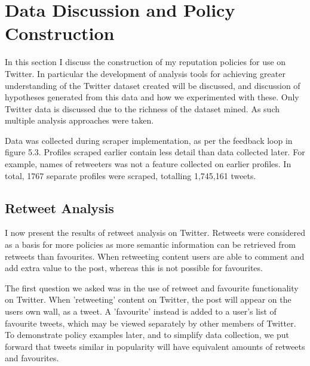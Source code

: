 \chapter{Data Discussion and Policy Construction}\label{C:us}

In this section I discuss the construction of my reputation policies for use on Twitter. In particular the development of analysis tools for achieving greater understanding of the Twitter dataset created will be discussed, and discussion of hypotheses generated from this data and how we experimented with these. Only Twitter data is discussed due to the richness of the dataset mined. As such multiple analysis approaches were taken.

Data was collected during scraper implementation, as per the feedback loop in figure 5.3. Profiles scraped earlier contain less detail than data collected later. For example, names of retweeters was not a feature collected on earlier profiles. In total, 1767 separate profiles were scraped, totalling 1,745,161 tweets. 





\section{Retweet Analysis}

I now present the results of retweet analysis on Twitter. Retweets were considered as a basis for more policies as more semantic information can be retrieved from retweets than favourites. When retweeting content users are able to comment and add extra value to the post, whereas this is not possible for favourites.

The first question we asked was in the use of retweet and favourite functionality on Twitter. When 'retweeting' content on Twitter, the post will appear on the users own wall, as a tweet. A 'favourite' instead is added to a user's list of favourite tweets, which may be viewed separately by other members of Twitter. To demonstrate policy examples later, and to simplify data collection, we put forward that tweets similar in popularity will have equivalent amounts of retweets and favourites. 

